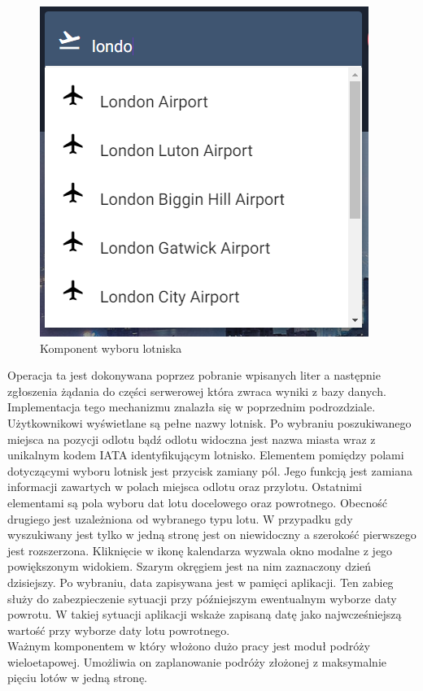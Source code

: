 \documentclass[12pt, twoside]{report}
\begin{document}
\begin{figure}[!ht]
\centering
\includegraphics[scale=0.8, keepaspectratio]{airport_choose.png}
\caption{Komponent wyboru lotniska}
\label{fig:search_panel}
\end{figure}

Operacja ta jest dokonywana poprzez pobranie wpisanych liter a następnie zgłoszenia żądania do części serwerowej która zwraca wyniki z bazy danych. Implementacja tego mechanizmu znalazła się w poprzednim podrozdziale. Użytkownikowi wyświetlane są pełne nazwy lotnisk. Po wybraniu poszukiwanego miejsca na pozycji odlotu bądź odlotu widoczna jest nazwa miasta wraz z unikalnym kodem IATA identyfikującym lotnisko. Elementem pomiędzy polami dotyczącymi wyboru lotnisk jest przycisk zamiany pól. Jego funkcją jest zamiana informacji zawartych w polach miejsca odlotu oraz przylotu. Ostatnimi elementami są pola wyboru dat lotu docelowego oraz powrotnego. Obecność drugiego jest uzależniona od wybranego typu lotu. W przypadku gdy wyszukiwany jest tylko w jedną stronę jest on niewidoczny a szerokość pierwszego jest rozszerzona. Kliknięcie w ikonę kalendarza wyzwala okno modalne z jego powiększonym widokiem. Szarym okręgiem jest na nim zaznaczony dzień dzisiejszy. Po wybraniu, data zapisywana jest w pamięci aplikacji. Ten zabieg służy do zabezpieczenie sytuacji przy późniejszym ewentualnym wyborze daty powrotu. W takiej sytuacji aplikacji wskaże zapisaną datę jako najwcześniejszą wartość przy wyborze daty lotu powrotnego. \\ \indent
Ważnym komponentem w który włożono dużo pracy jest moduł podróży wieloetapowej. Umożliwia on zaplanowanie podróży złożonej z maksymalnie pięciu lotów w jedną stronę.
\end{document}
